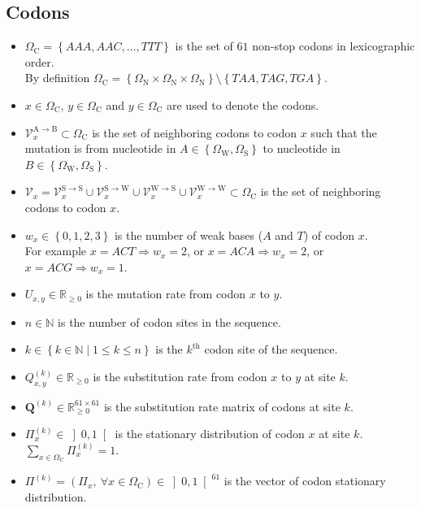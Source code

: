 \documentclass{article}
\newcommand{\SetCodon}{\Omega_{\mathrm{C}}}
\newcommand{\SetNuc}{\Omega_{\mathrm{N}}}
\newcommand{\SetWeak}{\Omega_{\mathrm{W}}}
\newcommand{\SetStrong}{\Omega_{\mathrm{S}}}
\newcommand{\Neighbor}{\mathcal{V}}
\newcommand{\Nx}{\Neighbor_x}
\newcommand{\NxAB}{\Neighbor_x^{\mathrm{A} \rightarrow \mathrm{B}}}
\newcommand{\NxWS}{\Neighbor_x^{\mathrm{W} \rightarrow \mathrm{S}}}
\newcommand{\NxSS}{\Neighbor_x^{\mathrm{S} \rightarrow \mathrm{S}}}
\newcommand{\NxSW}{\Neighbor_x^{\mathrm{S} \rightarrow \mathrm{W}}}
\newcommand{\NxWW}{\Neighbor_x^{\mathrm{W} \rightarrow \mathrm{W}}}
\begin{document}
    \subsection{Codons}
    \begin{itemize}
        \item $\SetCodon = \left\{ AAA,AAC, \dots, TTT \right\} $ is the set of $61$ non-stop codons in lexicographic order.
        \\By definition $\SetCodon = \left\{ \SetNuc \times \SetNuc \times \SetNuc \right\} \setminus \left\{ TAA, TAG, TGA \right\} $.
        \item $x \in \SetCodon $, $y \in \SetCodon $ and $y \in \SetCodon $ are used to denote the codons.
        \item $\NxAB \subset \SetCodon $ is the set of neighboring codons to codon $x$ such that the mutation is from nucleotide in $A \in \left\{ \SetWeak, \SetStrong \right\}$ to nucleotide in $B \in \left\{ \SetWeak, \SetStrong \right\}$.
        \item $\Nx =  \NxSS \cup \NxSW \cup \NxWS \cup \NxWW \subset \SetCodon $ is the set of neighboring codons to codon $x$.
        \item $w_x \in \left\{0,1,2,3 \right\}$ is the number of weak bases ($A$ and $T$) of codon $x$.
        \\For example $x=ACT \Rightarrow w_x=2$, or  $x=ACA \Rightarrow w_x=2$, or $x=ACG \Rightarrow w_x=1$.
        \item $U_{x,y} \in \mathbb{R}_{\geq 0} $ is the mutation rate from codon $x$ to $y$.
        \item $n \in \mathbb{N}$ is the number of codon sites in the sequence.
        \item $k \in \left\{ k \in \mathbb{N} \mid 1 \leq k \leq n \right\}$ is the $k^{\mathrm{th}}$ codon site of the sequence.
        \item $Q_{x,y}^{(k)} \in \mathbb{R}_{\geq 0} $ is the substitution rate from codon $x$ to $y$ at site $k$.
        \item $\bm{Q}^{(k)} \in \mathbb{R}_{\geq 0}^{61 \times 61} $ is the substitution rate matrix of codons at site $k$.
        \item $\Pi_x^{(k)} \in \left]0,1\right[ $ is the stationary distribution of codon $x$ at site $k$. $\sum_{x \in \SetCodon} \Pi_x^{(k)} = 1$.
        \item $\Pi^{(k)} = \left( \Pi_x , \ \forall x \in \SetCodon \right) \in \left]0,1\right[^{61} $ is the vector of codon stationary distribution.
    \end{itemize}
\end{document}
